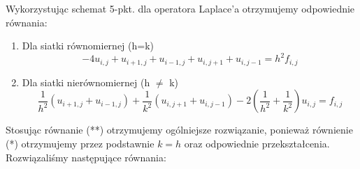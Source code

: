 Wykorzystując schemat 5-pkt. dla operatora Laplace'a otrzymujemy odpowiednie równania:\\

\begin{enumerate}
	\item Dla siatki równomiernej (h=k)
	\begin{equation}
-4u_{i,j} + u_{i+1,j} + u_{i-1,j} + u_{i,j+1} + u_{i,j-1} = h^2 f_{i,j} \tag{*}
	\end{equation}
	
	\item Dla siatki nierównomiernej (h $\neq$ k)
	\begin{equation}
		\dfrac{1}{h^2}\left(u_{i+1,j} + u_{i-1,j} \right) + \dfrac{1}{k^2} \left(u_{i,j+1} + u_{i,j-1} \right) -2\left(\dfrac{1}{h^2} + \dfrac{1}{k^2} \right)u_{i,j} = f_{i,j} \tag{**}
	\end{equation}	
\end{enumerate}
Stosując równanie (**) otrzymujemy ogólniejsze rozwiązanie, ponieważ równienie (*) otrzymujemy przez podstawnie $k=h$ oraz odpowiednie przekształcenia.
\\	
\newpage
Rozwiązaliśmy następujące równania:
